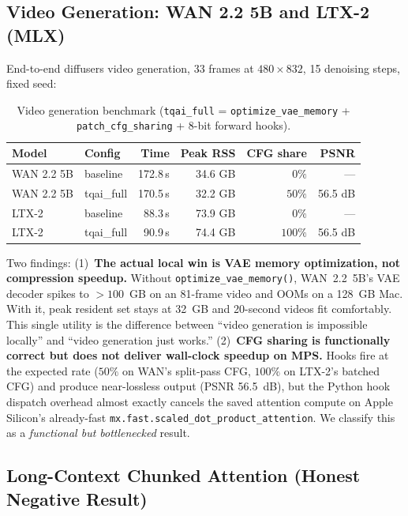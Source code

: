 \documentclass[11pt,a4paper]{article}
\begin{document}
\subsection{Video Generation: WAN 2.2 5B and LTX-2 (MLX)}\label{sec:bench-video}

End-to-end diffusers video generation, 33 frames at $480 \times 832$, 15 denoising steps, fixed seed:

\begin{table}[h]
\centering
\caption{Video generation benchmark (\texttt{tqai\_full} = \texttt{optimize\_vae\_memory} + \texttt{patch\_cfg\_sharing} + 8-bit forward hooks).}
\label{tab:video-benchmark}
\begin{tabular}{llrrrr}
\toprule
\textbf{Model} & \textbf{Config} & \textbf{Time} & \textbf{Peak RSS} & \textbf{CFG share} & \textbf{PSNR} \\
\midrule
WAN 2.2 5B & baseline   & 172.8\,s & 34.6 GB & $0\%$   & --- \\
WAN 2.2 5B & tqai\_full & 170.5\,s & 32.2 GB & $50\%$  & 56.5 dB \\
LTX-2      & baseline   & 88.3\,s  & 73.9 GB & $0\%$   & --- \\
LTX-2      & tqai\_full & 90.9\,s  & 74.4 GB & $100\%$ & 56.5 dB \\
\bottomrule
\end{tabular}
\end{table}

Two findings: (1)~\textbf{The actual local win is VAE memory optimization, not compression speedup.} Without \texttt{optimize\_vae\_memory()}, WAN~2.2~5B's VAE decoder spikes to ${>}100$~GB on an 81-frame video and OOMs on a 128~GB Mac. With it, peak resident set stays at 32~GB and 20-second videos fit comfortably. This single utility is the difference between ``video generation is impossible locally'' and ``video generation just works.''
(2)~\textbf{CFG sharing is functionally correct but does not deliver wall-clock speedup on MPS.} Hooks fire at the expected rate ($50\%$ on WAN's split-pass CFG, $100\%$ on LTX-2's batched CFG) and produce near-lossless output (PSNR 56.5~dB), but the Python hook dispatch overhead almost exactly cancels the saved attention compute on Apple Silicon's already-fast \texttt{mx.fast.scaled\_dot\_product\_attention}. We classify this as a \emph{functional but bottlenecked} result.

\subsection{Long-Context Chunked Attention (Honest Negative Result)}
\end{document}
